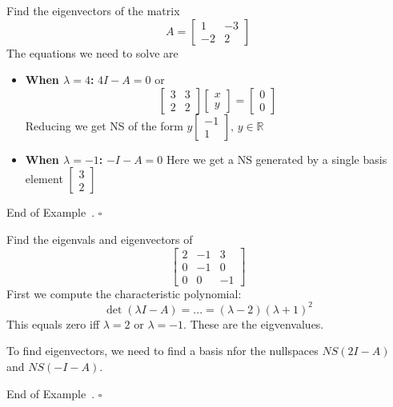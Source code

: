 \documentclass[10pt]{article}
\theoremstyle{definition}
\newtheorem{example}[theorem]{Example}
\renewenvironment{example}
{\begin{oldexample}}
  {\par\smallskip\hfill   End of Example~\theexample. $\square$    \par\end{oldexample}}
\newcommand{\R}{\mathbb{R}}           %
\begin{document}
\begin{example}
  Find the eigenvectors of the matrix
  \begin{equation*}
    A=
    \begin{bmatrix}
      1&-3\\
      -2&2
    \end{bmatrix}
  \end{equation*}
  The equations we need to solve are
  \begin{itemize}
    \item \textbf{When $\lambda=4$:} $4I-A=0$ or
    \begin{equation*}
      \begin{bmatrix}
        3&3\\
        2&2
      \end{bmatrix}
      \begin{bmatrix}
        x\\y
      \end{bmatrix}
      =
      \begin{bmatrix}
        0\\0
      \end{bmatrix}
    \end{equation*}
    Reducing we get NS of the form $y
    \begin{bmatrix}
      -1\\1
    \end{bmatrix}, \, y\in \R
    $
    \item \textbf{When $\lambda=-1$:} $-I-A=0$
    Here we get a NS generated by a single basis element $
    \begin{bmatrix}
      3\\2
    \end{bmatrix}
    $
  \end{itemize}
\end{example}


\begin{example}
  Find the eigenvals and eigenvectors of
  \begin{equation*}
    \begin{bmatrix}
      2&-1&3\\
      0&-1&0\\
      0&0&-1
    \end{bmatrix}
  \end{equation*}
  First we compute the characteristic polynomial:
  \begin{equation*}
    \det(\lambda I-A) = ... = (\lambda-2)(\lambda+1)^{2}
  \end{equation*}
  This equals zero iff $\lambda=2$ or $\lambda=-1$. These are the
  eigvenvalues.

  To find eigenvectors, we need to find a basis nfor the nullspaces $NS(2I-A)$
  and $NS(-I-A)$.
\end{example}
\end{document}

